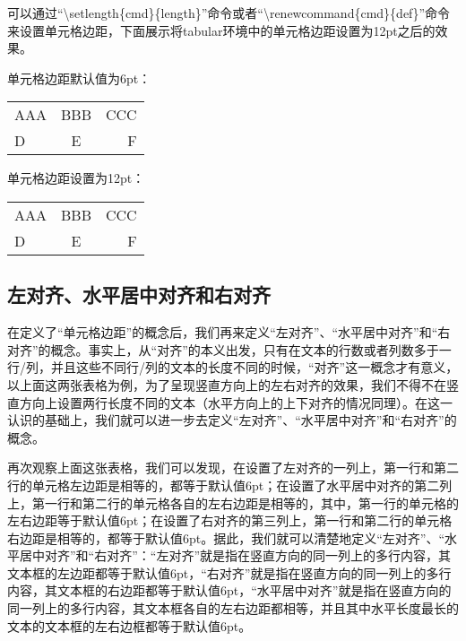 ﻿\documentclass{article}
\begin{document}
    可以通过``\textbackslash setlength\{cmd\}\{length\}''命令或者``\textbackslash renewcommand\{cmd\}\{def\}''命令来设置单元格边距，下面展示将tabular环境中的单元格边距设置为12pt之后的效果。

    单元格边距默认值为6pt：

    \mbox{}

    \begin{tabular}{l|c|r}
        \hline
        AAA&BBB&CCC\\
        D&E&F\\
        \hline
    \end{tabular}

    \mbox{}

    单元格边距设置为12pt：

    \mbox{}

    {\renewcommand{\tabcolsep}{12pt}

    \begin{tabular}{l|c|r}
        \hline
        AAA&BBB&CCC\\
        D&E&F\\
        \hline
    \end{tabular}
    }

\subsection{左对齐、水平居中对齐和右对齐}
    在定义了``单元格边距''的概念后，我们再来定义``左对齐''、``水平居中对齐''和``右对齐''的概念。事实上，从``对齐''的本义出发，只有在文本的行数或者列数多于一行/列，并且这些不同行/列的文本的长度不同的时候，``对齐''这一概念才有意义，以上面这两张表格为例，为了呈现竖直方向上的左右对齐的效果，我们不得不在竖直方向上设置两行长度不同的文本（水平方向上的上下对齐的情况同理）。在这一认识的基础上，我们就可以进一步去定义``左对齐''、``水平居中对齐''和``右对齐''的概念。

    再次观察上面这张表格，我们可以发现，在设置了左对齐的一列上，第一行和第二行的单元格左边距是相等的，都等于默认值6pt；在设置了水平居中对齐的第二列上，第一行和第二行的单元格各自的左右边距是相等的，其中，第一行的单元格的左右边距等于默认值6pt；在设置了右对齐的第三列上，第一行和第二行的单元格右边距是相等的，都等于默认值6pt。据此，我们就可以清楚地定义``左对齐''、``水平居中对齐''和``右对齐''：``左对齐''就是指在竖直方向的同一列上的多行内容，其文本框的左边距都等于默认值6pt，``右对齐''就是指在竖直方向的同一列上的多行内容，其文本框的右边距都等于默认值6pt，``水平居中对齐''就是指在竖直方向的同一列上的多行内容，其文本框各自的左右边距都相等，并且其中水平长度最长的文本的文本框的左右边框都等于默认值6pt。
\end{document}
